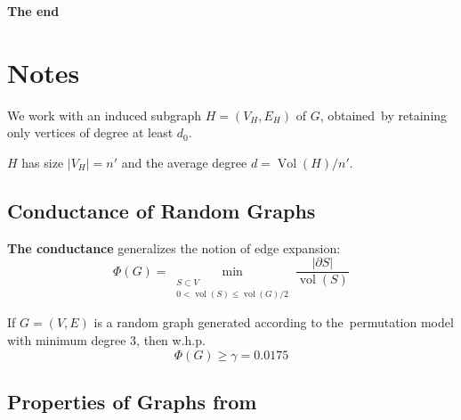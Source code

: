 \documentclass{beamer}
\DeclareMathOperator*{\vol}{vol}
\DeclareMathOperator*{\Vol}{Vol}
\newcommand{\autotitle}{\secname\ifdefempty{\subsecname}{}{~--- \subsecname}}
\newcommand{\clearsubsecname}{\long\def\subsecname{}}
\begin{document}
\begin{frame}[standout]
    \centering
    \textbf{The end}
\end{frame}

\section{Notes}
\clearsubsecname

\begin{frame}{\autotitle}
    We work with an induced subgraph $H=(V_H,E_H)$ of $G$,
    obtained~by retaining only vertices of degree at least $d_0$.
    
    $H$ has size $|V_H|=n'$ and the average degree $d=\Vol(H)/n'$.
\end{frame}

\subsection{Conductance of Random Graphs}

\begin{frame}{\autotitle}
    \textbf{The conductance} generalizes the notion of edge expansion:
    \begin{equation*}
        \Phi(G)=\min_{\substack{S\subset V\\0<\vol(S)\leq \vol(G)/2}}
        \frac{|\partial S|}{\vol(S)}
    \end{equation*}
    \begin{theorem}
        If $G=(V,E)$ is a random graph generated according to
        the~permutation model with minimum degree $3$, then w.h.p.
        \begin{equation*}
            \Phi(G)\geq\gamma=0.0175
        \end{equation*}
    \end{theorem}
\end{frame}

\subsection{Properties of Graphs from~\texorpdfstring{\cite{acl01}}{[ACL01]}}
\end{document}
